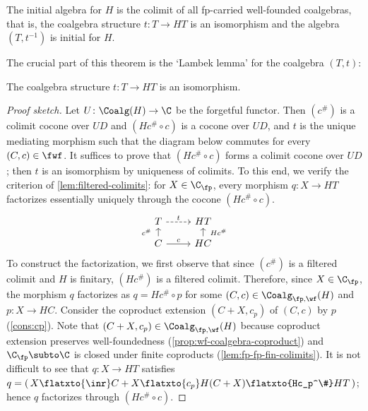 \begin{theorem}\label{thm:wf-initial-algebra}
The initial algebra for $H$ is the colimit of all fp-carried well-founded coalgebras, that is, the coalgebra structure $t\colon T\to HT$ is an isomorphism and the algebra $(T,t^{-1})$ is initial for $H$.
\end{theorem}

The crucial part of this theorem is the `Lambek lemma' for the coalgebra $(T,t)$:
\begin{lemma}[\smash{\injmono}, \hpresint]\label{lem:t-iso-wf}
The coalgebra structure $t\colon T\to HT$ is an isomorphism.
\end{lemma}

\begin{proof}[Proof sketch]
Let $U\colon \Coalg(H)\to \C$ be the forgetful functor. Then $(c^\#)$ is a colimit cocone over $UD$ and $(Hc^\#\circ c)$ is a cocone over $UD$, and $t$ is the unique mediating morphism such that the diagram below commutes for every $(C,c)\in \fwf$. It suffices to prove that
  $(Hc^\#\circ c)$ forms a colimit cocone over $UD$; then $t$ is an isomorphism by uniqueness of colimits. To this end, we verify the criterion of \autoref{lem:filtered-colimits}: for $X\in \C_\fp$, every morphism $q\colon X \to HT$ factorizes essentially uniquely through the cocone $(Hc^\# \circ c)$.
\[  
\begin{tikzcd}[row sep=3mm,outer sep=0pt]
T \ar[dashed]{r}{t} & HT \\
C \ar{u}[outer sep=5pt]{c^\#} \ar{r}{c} & HC \ar{u}[swap,outer sep=5pt]{Hc^\#}
\end{tikzcd}
\]
To construct the factorization, we first observe that since $(c^\#)$ is a filtered colimit and $H$ is finitary, $(Hc^\#)$ is a filtered colimit. Therefore, since $X\in \C_\fp$, the morphism $q$ factorizes as $q=Hc^\# \circ p$ for some $(C,c)\in \Coalg_{\fp,\wf}(H)$ and $p\colon X\to HC$. Consider the coproduct extension $(C+X,c_p)$ of $(C,c)$ by $p$ (\autoref{cons:cp}). Note that $(C+X,c_p)\in \Coalg_{\fp,\wf}(H)$ because coproduct extension preserves well-foundedness (\autoref{prop:wf-coalgebra-coproduct}) and $\C_\fp\subto \C$ is closed under finite coproducts (\autoref{lem:fp-fp-fin-colimits}). It is not difficult to see that $q\colon X\to HT$ satisfies $q=(\,X \flatxto{\inr} C+X \flatxto{c_p}  H(C+X)\flatxto{Hc_p^\#}  HT\,)$; hence $q$ factorizes through $(Hc^\# \circ c)$.
\end{proof}

